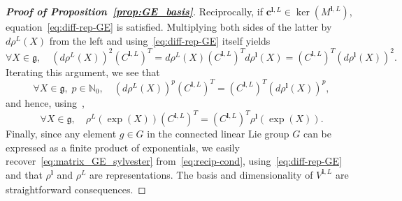 \documentclass{article}
\newcommand{\rep}[2]{\rho^{#1}_{#2}}
\numberwithin{equation}{section}
\def\N{\mathbb{N}}
\def\bc{{\bm c}}
\def\bl{{\bm l}}
\begin{document}
\begin{proof}[\bf{Proof of Proposition~\ref{prop:GE_basis}}]
Reciprocally, if $\bc^{\bl,L} \in\ker(M^{\bl,L})$, equation~\eqref{eq:diff-rep-GE} is satisfied.
Multiplying both sides of the latter by $d\rep{L}{}(X)$ from the left and using~\eqref{eq:diff-rep-GE} itself  yields
\[
    \forall X\in\mathfrak g, \quad \left(d\rep{L}{}(X)\right)^2\left(C^{\bl,L}\right)^T = d\rep{L}{}(X)\left(C^{\bl,L}\right)^Td\rep{\bl}{}(X) = \left(C^{\bl,L}\right)^T\left(d\rep{\bl}{}(X)\right)^2.
\]
Iterating this argument, we see that
\[
    \forall X\in\mathfrak g,\; p\in\N_0, \quad \left(d\rep{L}{}(X)\right)^p\left(C^{\bl,L}\right)^T = \left(C^{\bl,L}\right)^T\left(d\rep{\bl}{}(X)\right)^p,
\]
and hence, using~\cite[(3.11)]{Hall2013-af},
\begin{equation}\label{eq:recip-cond}
    \forall X\in\mathfrak g,\quad \rep{L}{}\left(\exp(X)\right)\left(C^{\bl,L}\right)^T = \left(C^{\bl,L}\right)^T\rep{\bl}{}\left(\exp(X)\right).
\end{equation}
Finally, since any element $g\in G$ in the connected linear Lie group $G$ can be expressed as a finite product of exponentials, we easily recover~\eqref{eq:matrix_GE_sylvester} from~\eqref{eq:recip-cond}, using~\eqref{eq:diff-rep-GE} and that $\rep{\bl}{}$ and  $\rep{L}{}$ are representations.
The basis and dimensionality of $V^{\bl,L}$ are straightforward consequences.
\end{proof}
\end{document}
